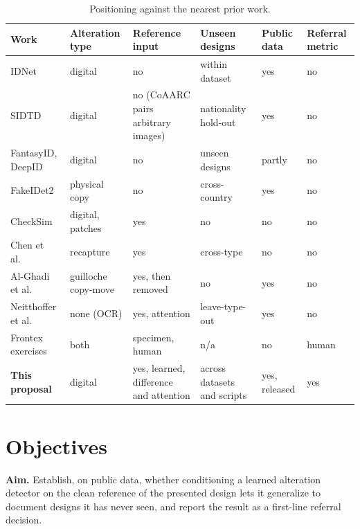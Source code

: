 \documentclass[11pt,a4paper]{article}
\begin{document}
\begin{table}[t]
\centering\small
\setlength{\tabcolsep}{4pt}
\caption{Positioning against the nearest prior work.}
\label{tab:position}
\begin{tabular}{L{3.3cm}L{1.8cm}L{2.0cm}L{2.3cm}L{1.5cm}L{1.8cm}}
\toprule
Work & Alteration type & Reference input & Unseen designs & Public data & Referral metric \\
\midrule
IDNet \cite{guan2024idnet} & digital & no & within dataset & yes & no \\
SIDTD \cite{boned2024sidtd} & digital & no (CoAARC pairs arbitrary images) & nationality hold-out & yes & no \\
FantasyID, DeepID \cite{korshunov2025fantasyid,korshunov2025deepid} & digital & no & unseen designs & partly & no \\
FakeIDet2 \cite{munozharo2026fakeidet2} & physical copy & no & cross-country & yes & no \\
CheckSim \cite{ghanmi2021checksim} & digital, patches & yes & no & no & no \\
Chen et al.\ \cite{chen2022domain} & recapture & yes & cross-type & no & no \\
Al-Ghadi et al.\ \cite{alghadi2022guilloche,alghadi2023fmidv} & guilloche copy-move & yes, then removed & no & yes & no \\
Neitthoffer et al.\ \cite{neitthoffer2023knowledge} & none (OCR) & yes, attention & leave-type-out & yes & no \\
Frontex exercises \cite{gariup2019firstline} & both & specimen, human & n/a & no & human \\
\textbf{This proposal} & digital & yes, learned, difference and attention & across datasets and scripts & yes, released & yes \\
\bottomrule
\end{tabular}
\end{table}

\FloatBarrier
\section{Objectives}
\label{sec:objectives}

\textbf{Aim.} Establish, on public data, whether conditioning a learned alteration detector on the clean reference of the presented design lets it generalize to document designs it has never seen, and report the result as a first-line referral decision.
\end{document}
